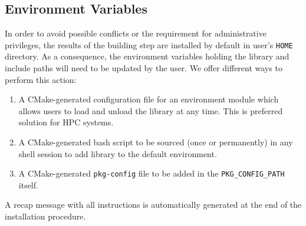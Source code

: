 \documentclass[edipack_sp.tex]{subfiles}
\begin{document}
\subsection{Environment Variables}\label{sSecInstallOSloading}
In order to avoid possible conflicts or the requirement for administrative
privileges, the results of the building step are installed by default in user's {\tt HOME}
directory.
As a consequence, the environment variables holding the library and include paths will need to be updated by the user.
We offer different ways to perform this action:
\begin{enumerate}
\item  A CMake-generated configuration file for an environment module which allows users to load and unload the library at any time. This is
  preferred solution for HPC systems. 
\item A CMake-generated bash script to be sourced (once or
  permanently) in any shell session to add \NAME library to the
  default environment.
\item A CMake-generated {\tt pkg-config} file to be added in
  the {\tt PKG\_CONFIG\_PATH} itself.  
\end{enumerate}
A recap message with all instructions is automatically generated at the end of the installation procedure.

\ifSubfilesClassLoaded{
  
}{}
\end{document}
